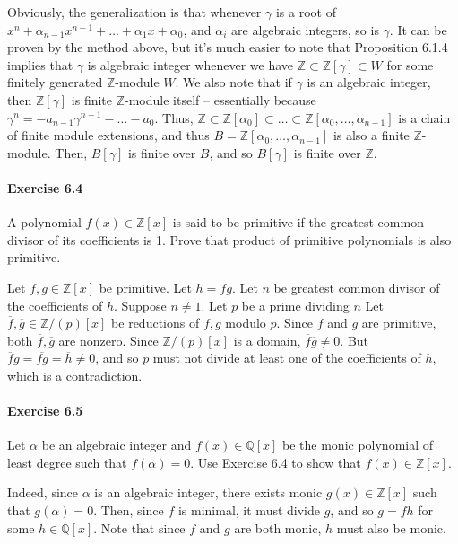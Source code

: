 \documentclass[notitlepage]{article}
\theoremstyle{definition}
\newcommand\Q{\mathbb{Q}}
\newcommand\Z{\mathbb{Z}}
\begin{document}
Obviously, the generalization is that whenever $\gamma$ is a root of
$x^n + \alpha_{n-1} x^{n-1} + \ldots + \alpha_1 x + \alpha_0$, and
$\alpha_i$ are algebraic integers, so is $\gamma$. It can be proven by
the method above, but it's much easier to note that Proposition 6.1.4
implies that $\gamma$ is algebraic integer whenever we have $\Z
\subset \Z[\gamma] \subset W$ for some finitely generated $\Z$-module
$W$. We also note that if $\gamma$ is an algebraic integer, then
$\Z[\gamma]$ is finite $\Z$-module itself -- essentially because
$\gamma^n = -a_{n-1} \gamma^{n-1} - \ldots - a_0$. Thus, $\Z \subset
\Z[\alpha_0] \subset \ldots \subset \Z[\alpha_0, \ldots, \alpha_{n-1}]$
  is a chain of finite module extensions, and thus $B = \Z[\alpha_0,
    \ldots, \alpha_{n-1}]$ is also a finite $\Z$-module. Then,
  $B[\gamma]$ is finite over $B$, and so $B[\gamma]$ is finite over
  $\Z$.

\paragraph{Exercise 6.4}
A polynomial $f(x) \in \Z[x]$ is said to be primitive if the greatest
common divisor of its coefficients is 1. Prove that product of
primitive polynomials is also primitive.

Let $f, g \in \Z[x]$ be primitive. Let $h = fg$. Let $n$ be greatest
common divisor of the coefficients of $h$. Suppose $n \ne 1$. Let $p$
be a prime dividing $n$ Let $\overline{f}, \overline{g} \in \Z/(p)[x]$
be reductions of $f, g$ modulo $p$. Since $f$ and $g$ are primitive,
both $\overline{f}, \overline{g}$ are nonzero. Since $\Z/(p)[x]$ is a
domain, $\overline{f}\overline{g} \ne 0$. But
$\overline{f}\overline{g} = \overline{fg} = \overline{h} \ne 0$, and
so $p$ must not divide at least one of the coefficients of $h$, which
is a contradiction.

\paragraph{Exercise 6.5}
Let $\alpha$ be an algebraic integer and $f(x) \in \Q[x]$ be the monic
polynomial of least degree such that $f(\alpha) = 0$. Use Exercise 6.4
to show that $f(x) \in \Z[x]$.

Indeed, since $\alpha$ is an algebraic integer, there exists monic
$g(x) \in \Z[x]$ such that $g(\alpha) = 0$. Then, since $f$ is
minimal, it must divide $g$, and so $g = fh$ for some $h \in
\Q[x]$. Note that since $f$ and $g$ are both monic, $h$ must also be
monic.
\end{document}
